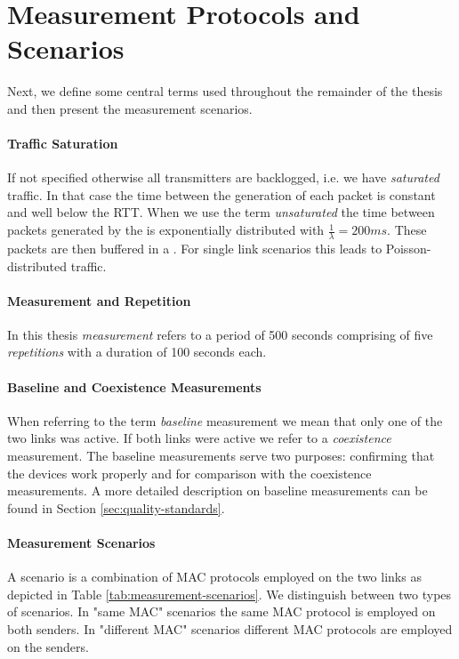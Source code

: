 \section{Measurement Protocols and Scenarios}
\label{sec:measurement-scenarios}

Next, we define some central terms used throughout the remainder of the thesis and then present the measurement scenarios.

\paragraph{Traffic Saturation}
If not specified otherwise all transmitters are backlogged, i.e. we have \emph{saturated} traffic. In that case the time between the generation of each packet is constant and well below the RTT. When we use the term \emph{unsaturated} the time between packets generated by the  is exponentially distributed with $\frac{1}{\lambda}=200ms$. These packets are then buffered in a . For single link scenarios this leads to Poisson-distributed traffic.

\paragraph{Measurement and Repetition}
In this thesis \emph{measurement} refers to a period of 500 seconds comprising of five \emph{repetitions} with a duration of 100 seconds each. 

\paragraph{Baseline and Coexistence Measurements}
When referring to the term \emph{baseline} measurement we mean that only one of the two links was active. If both links were active we refer to a \emph{coexistence} measurement. The baseline measurements serve two purposes: confirming that the devices work properly and for comparison with the coexistence measurements. A more detailed description on baseline measurements can be found in Section \ref{sec:quality-standards}.   

\paragraph{Measurement Scenarios}
A scenario is a combination of  MAC protocols employed on the two links as depicted in Table \ref{tab:measurement-scenarios}. We distinguish between two types of scenarios. In "same MAC" scenarios the same MAC protocol is employed on both senders. In "different MAC" scenarios different MAC protocols are employed on the senders.

